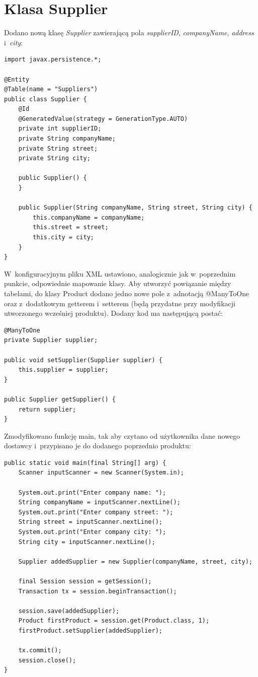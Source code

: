 \documentclass[12pt, a4paper]{mwart}
\begin{document}
\clearpage
\section{Klasa Supplier}

Dodano nową klasę \textit{Supplier} zawierającą pola \textit{supplierID}, \textit{companyName}, \textit{address} i~\textit{city}:

\begin{lstlisting}
import javax.persistence.*;

@Entity
@Table(name = "Suppliers")
public class Supplier {
    @Id
    @GeneratedValue(strategy = GenerationType.AUTO)
    private int supplierID;
    private String companyName;
    private String street;
    private String city;

    public Supplier() {
    }

    public Supplier(String companyName, String street, String city) {
        this.companyName = companyName;
        this.street = street;
        this.city = city;
    }
}
\end{lstlisting}

W~konfiguracyjnym pliku XML ustawiono, analogicznie jak w~poprzednim punkcie, odpowiednie mapowanie klasy. Aby utworzyć powiązanie między tabelami, do klasy Product dodano jedno nowe pole z~adnotacją @ManyToOne oraz z~dodatkowym getterem i~setterem (będą przydatne przy modyfikacji utworzonego wcześniej produktu). Dodany kod ma następującą postać:

\begin{lstlisting}
@ManyToOne
private Supplier supplier;

public void setSupplier(Supplier supplier) {
	this.supplier = supplier;
}

public Supplier getSupplier() {
	return supplier;
}
\end{lstlisting}

Zmodyfikowano funkcję main, tak aby czytano od użytkownika dane nowego dostawcy i~przypisano je do dodanego poprzednio produktu:

\begin{lstlisting}
public static void main(final String[] arg) {
	Scanner inputScanner = new Scanner(System.in);

	System.out.print("Enter company name: ");
	String companyName = inputScanner.nextLine();
	System.out.print("Enter company street: ");
	String street = inputScanner.nextLine();
	System.out.print("Enter company city: ");
	String city = inputScanner.nextLine();

	Supplier addedSupplier = new Supplier(companyName, street, city);

	final Session session = getSession();
	Transaction tx = session.beginTransaction();

	session.save(addedSupplier);
	Product firstProduct = session.get(Product.class, 1);
	firstProduct.setSupplier(addedSupplier);

	tx.commit();
	session.close();
}
\end{lstlisting}
\end{document}
